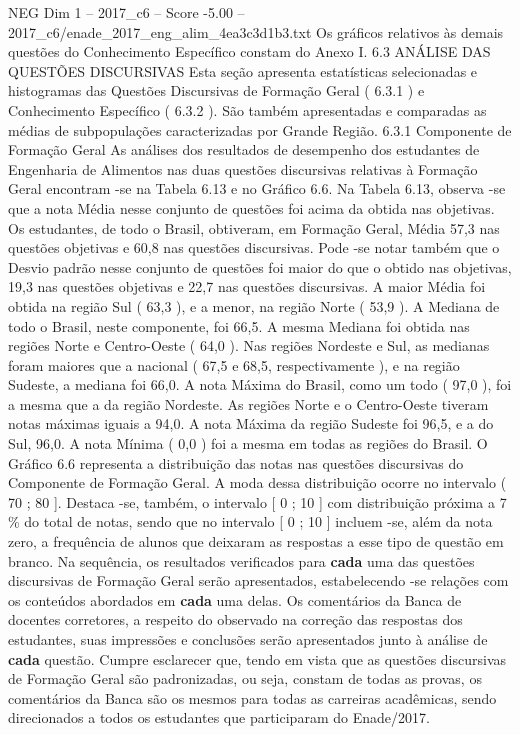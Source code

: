 \begin{textsample}{NEG Dim 1 – 2017\_c6 – Score -5.00 – 2017\_c6/enade\_2017\_eng\_alim\_4ea3c3d1b3.txt}
Os gráficos relativos às demais questões do Conhecimento Específico constam do Anexo I. 6.3 ANÁLISE DAS QUESTÕES DISCURSIVAS Esta seção apresenta estatísticas selecionadas e histogramas das Questões Discursivas de Formação Geral ( 6.3.1 ) e Conhecimento Específico ( 6.3.2 ).
São também apresentadas e comparadas as médias de subpopulações caracterizadas por Grande Região. 6.3.1 Componente de Formação Geral As análises dos resultados de desempenho dos estudantes de Engenharia de Alimentos nas duas questões discursivas relativas à Formação Geral encontram -se na Tabela 6.13 e no Gráfico 6.6.
Na Tabela 6.13, observa -se que a nota Média nesse conjunto de questões foi acima da obtida nas objetivas.
Os estudantes, de todo o Brasil, obtiveram, em Formação Geral, Média 57,3 nas questões objetivas e 60,8 nas questões discursivas.
Pode -se notar também que o Desvio padrão nesse conjunto de questões foi maior do que o obtido nas objetivas, 19,3 nas questões objetivas e 22,7 nas questões discursivas.
A maior Média foi obtida na região Sul ( 63,3 ), e a menor, na região Norte ( 53,9 ).
A Mediana de todo o Brasil, neste componente, foi 66,5.
A mesma Mediana foi obtida nas regiões Norte e Centro-Oeste ( 64,0 ).
Nas regiões Nordeste e Sul, as medianas foram maiores que a nacional ( 67,5 e 68,5, respectivamente ), e na região Sudeste, a mediana foi 66,0.
A nota Máxima do Brasil, como um todo ( 97,0 ), foi a mesma que a da região Nordeste.
As regiões Norte e o Centro-Oeste tiveram notas máximas iguais a 94,0.
A nota Máxima da região Sudeste foi 96,5, e a do Sul, 96,0.
A nota Mínima ( 0,0 ) foi a mesma em todas as regiões do Brasil.
O Gráfico 6.6 representa a distribuição das notas nas questões discursivas do Componente de Formação Geral.
A moda dessa distribuição ocorre no intervalo ( 70 ; 80 ].
Destaca -se, também, o intervalo [ 0 ; 10 ] com distribuição próxima a 7 \% do total de notas, sendo que no intervalo [ 0 ; 10 ] incluem -se, além da nota zero, a frequência de alunos que deixaram as respostas a esse tipo de questão em branco.
Na sequência, os resultados verificados para \textbf{cada} uma das questões discursivas de Formação Geral serão apresentados, estabelecendo -se relações com os conteúdos abordados em \textbf{cada} uma delas.
Os comentários da Banca de docentes corretores, a respeito do observado na correção das respostas dos estudantes, suas impressões e conclusões serão apresentados junto à análise de \textbf{cada} questão.
Cumpre esclarecer que, tendo em vista que as questões discursivas de Formação Geral são padronizadas, ou seja, constam de todas as provas, os comentários da Banca são os mesmos para todas as carreiras acadêmicas, sendo direcionados a todos os estudantes que participaram do Enade/2017.

\end{textsample}
